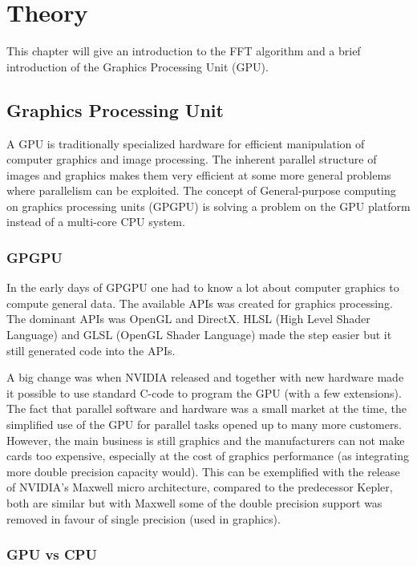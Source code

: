 \chapter{Theory}

This chapter will give an introduction to the FFT algorithm and a brief introduction of the Graphics Processing Unit (GPU).

\section{Graphics Processing Unit}

A GPU is traditionally specialized hardware for efficient manipulation of computer graphics and image processing. The inherent parallel structure of images and graphics makes them very efficient at some more general problems where parallelism can be exploited. The concept of General-purpose computing on graphics processing units (GPGPU) is solving a problem on the GPU platform instead of a multi-core CPU system.

\subsection{GPGPU}

In the early days of GPGPU one had to know a lot about computer graphics to compute general data. The available APIs was created for graphics processing. The dominant APIs was OpenGL and DirectX. HLSL (High Level Shader Language) and GLSL (OpenGL Shader Language) made the step easier but it still generated code into the APIs.

A big change was when NVIDIA released {\CU} and together with new hardware made it possible to use standard C-code to program the GPU (with a few extensions). The fact that parallel software and hardware was a small market at the time, the simplified use of the GPU for parallel tasks opened up to many more customers. However, the main business is still graphics and the manufacturers can not make cards too expensive, especially at the cost of graphics performance (as integrating more double precision capacity would). This can be exemplified with the release of NVIDIA's Maxwell micro architecture, compared to the predecessor Kepler, both are similar but with Maxwell some of the double precision support was removed in favour of single precision (used in graphics).

\subsection{GPU vs CPU}

